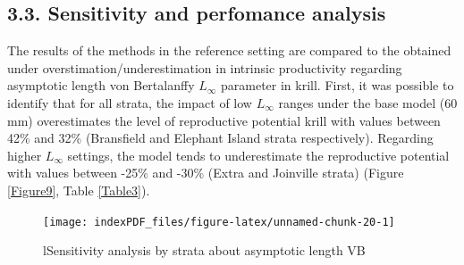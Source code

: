 \documentclass[
]{article}
\begin{document}
\newpage

\hypertarget{sensitivity-and-perfomance-analysis}{%
\subsection{3.3. Sensitivity and perfomance
analysis}\label{sensitivity-and-perfomance-analysis}}

The results of the methods in the reference setting are compared to the
obtained under overstimation/underestimation in intrinsic productivity
regarding asymptotic length von Bertalanffy \(L_{\infty}\) parameter in
krill. First, it was possible to identify that for all strata, the
impact of low \(L_{\infty}\) ranges under the base model (60 mm)
overestimates the level of reproductive potential krill with values
between 42\% and 32\% (Bransfield and Elephant Island strata
respectively). Regarding higher \(L_{\infty}\) settings, the model tends
to underestimate the reproductive potential with values between -25\%
and -30\% (Extra and Joinville strata) (Figure \ref{Figure9}, Table
\ref{Table3}).

\begin{figure}[H]

{\centering \texttt{[image: indexPDF\_files/figure-latex/unnamed-chunk-20-1]} 

}

\caption{\label{Figure9}lSensitivity analysis by strata about asymptotic length VB}\label{fig:unnamed-chunk-20}
\end{figure}
\end{document}
